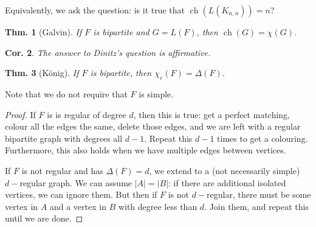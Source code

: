 \documentclass[12pt, a4paper]{book}
\DeclareMathOperator{\ch}{ch}
\newtheorem{theorem}{Thm.}[section]
\newtheorem{corollary}[theorem]{Cor.}
\theoremstyle{nonumberplain}
\newtheorem{proof}{Proof}
\begin{document}
Equivalently, we ask the question: is it true that $\ch(L(K_{n,n}))=n$?
\begin{theorem}[Galvin]
    If $F$ is bipartite and $G=L(F)$, then $\ch(G)=\chi(G)$.
\end{theorem}
\begin{corollary}
    The answer to Dinitz's question is affirmative.
\end{corollary}
\begin{theorem}[K\"onig]
    If $F$ is bipartite, then $\chi_e(F)=\Delta(F)$.
\end{theorem}
Note that we do not require that $F$ is simple.
\begin{proof}
    If $F$ is is regular of degree $d$, then this is true: get a perfect matching, colour all the edges the same, delete those edges, and we are left with a regular bipartite graph with degrees all $d-1$.
    Repeat this $d-1$ times to get a colouring.
    Furthermore, this also holds when we have multiple edges between vertices.

    If $F$ is not regular and has $\Delta(F)=d$, we extend to a (not necessarily simple) $d-$regular graph.
    We can assume $|A|=|B|$: if there are additional isolated vertices, we can ignore them.
    But then if $F$ is not $d-$regular, there must be some vertex in $A$ and a vertex in $B$ with degree less than $d$.
    Join them, and repeat this until we are done.
\end{proof}
\end{document}
